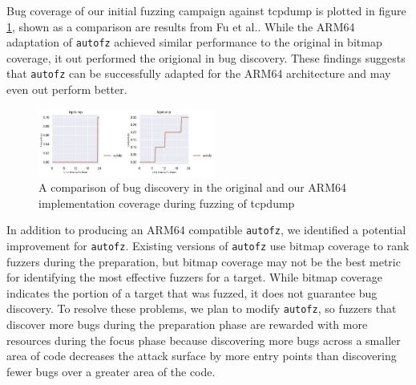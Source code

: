 Bug coverage of our initial fuzzing campaign against tcpdump is plotted in figure \ref{figs:tcp_compare_orig_arm64_ub.png}, 
shown as a comparison are results from Fu et al.\cite{fu_autofz_2023}. While the ARM64 adaptation of \texttt{autofz} achieved similar
performance to the original in bitmap coverage, it out performed the origional in bug discovery. These findings suggests that 
\texttt{autofz} can be successfully adapted for the ARM64 architecture and may even out perform better.

\begin{figure}
    \includegraphics[width=0.52\textwidth]{figs/tcpdump_compare_orig_arm64_ub.png}
    \centering
    \caption{A comparison of bug discovery in the original\cite{fu_autofz_2023} and our ARM64 implementation
    coverage during fuzzing of tcpdump}
    \label{figs:tcp_compare_orig_arm64_ub.png}
\end{figure}

In addition to producing an ARM64 compatible \texttt{autofz}, we identified a potential improvement for \texttt{autofz}.
Existing versions of \texttt{autofz} use bitmap coverage to rank fuzzers during the preparation, but bitmap
coverage may not be the best metric for identifying the most effective fuzzers for a target. While
bitmap coverage indicates the portion of a target that was fuzzed, it does not guarantee bug discovery.
To resolve these problems, we plan to modify \texttt{autofz}, so fuzzers that discover more bugs during the
preparation phase are rewarded with more resources during the focus phase because discovering more bugs
across a smaller area of code decreases the attack surface by more entry points than discovering fewer
bugs over a greater area of the code.